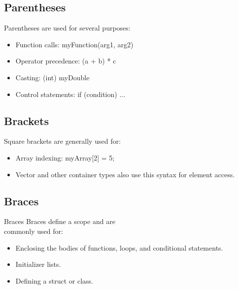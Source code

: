\documentclass{report}
\begin{document}
    \pagebreak
    \bigbreak \noindent 
    \begin{minipage}[t]{0.47\textwidth}
        \subsection{Parentheses}
        \bigbreak \noindent 
        Parentheses are used for several purposes:
        \begin{itemize}
            \item Function calls: myFunction(arg1, arg2)
            \item Operator precedence: (a + b) * c
            \item Casting: (int) myDouble
            \item Control statements: if (condition) { ... }
        \end{itemize}
    \end{minipage}
    \begin{minipage}[t]{0.47\textwidth}
    \subsection{Brackets}
    \bigbreak \noindent 
    Square brackets are generally used for:
    \begin{itemize}
        \item Array indexing: myArray[2] = 5;
        \item Vector and other container types also use this syntax for element access.
    \end{itemize}
    \end{minipage}
    \bigbreak \noindent \bigbreak \noindent 
    \begin{minipage}[t]{0.47\textwidth}
    \subsection{Braces}
    \bigbreak \noindent 
    Braces Braces define a scope and are \\ commonly used for:
    \begin{itemize}
        \item Enclosing the bodies of functions, loops, and conditional statements.
        \item Initializer lists.
        \item Defining a struct or class.
    \end{itemize}
    \end{minipage}
\end{document}
